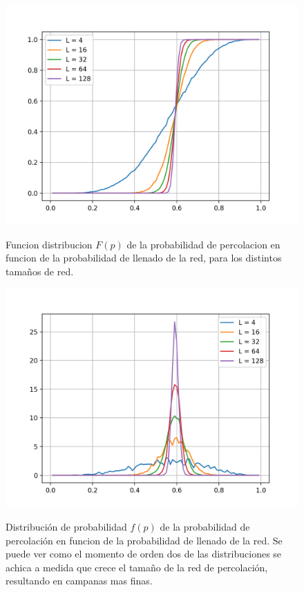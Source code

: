 \documentclass[
 reprint,
 amsmath,amssymb,
 aps,
]{revtex4-1}
\begin{document}
\begin{figure}[ht]
\begin{center}
\includegraphics[scale=0.62]{../images/F(p).png} \\
\caption{Funcion distribucion $F(p)$ de la probabilidad de percolacion en funcion de la probabilidad de llenado de la red, para los distintos tama\~nos de red.}\label{F(p)}
\end{center}
\end{figure}

\begin{figure}[ht]
\begin{center}
\includegraphics[scale=0.62]{../images/_f(p).png} \\
\caption{Distribuci\'on de probabilidad $f(p)$ de la probabilidad de percolaci\'on en funcion de la probabilidad de llenado de la red. Se puede ver como el momento de orden dos de las distribuciones se achica a medida que crece el tama\~no de la red de percolaci\'on, resultando en campanas mas finas.}\label{f(p)}
\end{center}
\end{figure}
\end{document}
